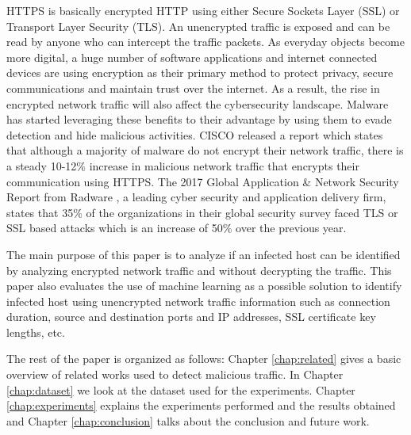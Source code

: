 HTTPS is basically encrypted HTTP using either Secure Sockets Layer (SSL) or Transport Layer Security (TLS). An unencrypted traffic is exposed and can be read by anyone who can intercept the traffic packets. As everyday objects become more digital, a huge number of software applications and internet connected devices are using encryption as their primary method to protect privacy, secure communications and maintain trust over the internet. As a result, the rise in encrypted network traffic will also affect the cybersecurity landscape. Malware has started leveraging these benefits to their advantage by using them to evade detection and hide malicious activities. CISCO released a report \cite{Anderson16} which states that although a majority of malware do not encrypt their network traffic, there is a steady 10-12\% increase in malicious network traffic that encrypts their communication using HTTPS. The 2017 Global Application \& Network Security Report from Radware \cite{Radware17}, a leading cyber security and application delivery firm, states that 35\% of the organizations in their global security survey faced TLS or SSL based attacks which is an increase of 50\% over the previous year.

The main purpose of this paper is to analyze if an infected host can be identified by analyzing encrypted network traffic and without decrypting the traffic. This paper also evaluates the use of machine learning as a possible solution to identify infected host using unencrypted network traffic information such as connection duration, source and destination ports and IP addresses, SSL certificate key lengths, etc.

The rest of the paper is organized as follows: Chapter \ref{chap:related} gives a basic overview of related works used to detect malicious traffic. In Chapter \ref{chap:dataset} we look at the dataset used for the experiments. Chapter \ref{chap:experiments} explains the experiments performed and the results obtained and Chapter \ref{chap:conclusion} talks about the conclusion and future work.
